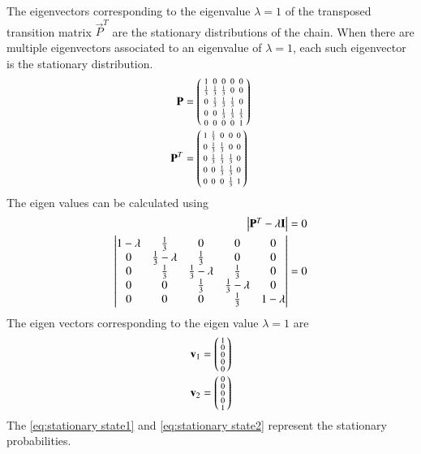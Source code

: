 \documentclass[journal,12pt,twocolumn]{IEEEtran}
\begin{document}
The eigenvectors corresponding to the  eigenvalue $\lambda = 1$ of the transposed transition matrix $\vec{P}^T$ are the  stationary distributions of the chain.
When there are multiple eigenvectors associated to an eigenvalue of $\lambda = 1$, each such eigenvector is the  stationary distribution. 
\begin{align}
	\mathbf{P}&=\begin{psmallmatrix}
			1 & 0 & 0 & 0 & 0 \\
			\frac{1}{3} & \frac{1}{3} & \frac{1}{3} & 0 & 0 \\
			0 & \frac{1}{3} & \frac{1}{3} & \frac{1}{3} & 0 \\
			0 & 0 & \frac{1}{3} & \frac{1}{3} & \frac{1}{3} \\
			0 & 0 & 0 & 0 & 1
		\end{psmallmatrix}\\
	\mathbf{P}^T&=\begin{psmallmatrix}
		1 & \frac{1}{3} & 0 & 0 & 0 \\
		0 & \frac{1}{3} & \frac{1}{3} & 0 & 0 \\
		0 & \frac{1}{3} & \frac{1}{3} & \frac{1}{3} & 0 \\
		0 & 0 & \frac{1}{3} & \frac{1}{3} & 0 \\
		0 & 0 & 0 & \frac{1}{3} & 1\end{psmallmatrix}\label{eq:PTranspose}
\end{align}
The eigen values can be calculated using 
\begin{align}
	\begin{vmatrix}\mathbf{P}^T-\lambda\mathbf{I}\end{vmatrix}=0\\
	\begin{vmatrix}
		1-\lambda & \frac{1}{3} & 0 & 0 & 0 \\
		0 & \frac{1}{3}-\lambda & \frac{1}{3} & 0 & 0 \\
		0 & \frac{1}{3} & \frac{1}{3}-\lambda & \frac{1}{3} & 0 \\
		0 & 0 & \frac{1}{3} & \frac{1}{3}-\lambda & 0 \\
		0 & 0 & 0 & \frac{1}{3} & 1-\lambda\end{vmatrix} =0
\end{align} 
The eigen vectors corresponding to the eigen value $\lambda = 1$ are  
\begin{align}
	\mathbf v_1 &=\begin{psmallmatrix}1 \\0 \\0 \\0 \\0	\end{psmallmatrix}\label{eq:stationary state1}\\
	\mathbf v_2 &=\begin{psmallmatrix}0 \\0 \\0 \\0 \\1	\end{psmallmatrix}\label{eq:stationary state2}
\end{align}
The \eqref{eq:stationary state1} and \eqref{eq:stationary state2} represent the stationary probabilities.
\end{document}
